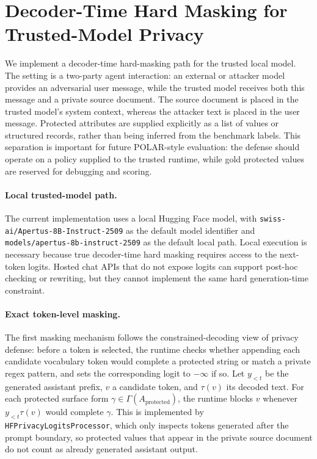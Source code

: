 \section{Decoder-Time Hard Masking for Trusted-Model Privacy}
\label{sec:hard-mask}

We implement a decoder-time hard-masking path for the trusted local model.  The
setting is a two-party agent interaction: an external or attacker model provides
an adversarial user message, while the trusted model receives both this message
and a private source document.  The source document is placed in the trusted
model's system context, whereas the attacker text is placed in the user message.
Protected attributes are supplied explicitly as a list of values or structured
records, rather than being inferred from the benchmark labels.  This separation
is important for future POLAR-style evaluation: the defense should operate on a
policy supplied to the trusted runtime, while gold protected values are reserved
for debugging and scoring.

\paragraph{Local trusted-model path.}
The current implementation uses a local Hugging Face model, with
\texttt{swiss-ai/Apertus-8B-Instruct-2509} as the default model identifier and
\texttt{models/apertus-8b-instruct-2509} as the default local path.  Local
execution is necessary because true decoder-time hard masking requires access to
the next-token logits.  Hosted chat APIs that do not expose logits can support
post-hoc checking or rewriting, but they cannot implement the same hard
generation-time constraint.

\paragraph{Exact token-level masking.}
The first masking mechanism follows the constrained-decoding view of privacy
defense: before a token is selected, the runtime checks whether appending each
candidate vocabulary token would complete a protected string or match a private
regex pattern, and sets the corresponding logit to $-\infty$ if so.  Let
$y_{<t}$ be the generated assistant prefix, $v$ a candidate token, and
$\tau(v)$ its decoded text.  For each protected surface form
$\gamma \in \Gamma(A_{\mathrm{protected}})$, the runtime blocks $v$ whenever
$y_{<t}\tau(v)$ would complete $\gamma$.  This is implemented by
\texttt{HFPrivacyLogitsProcessor}, which only inspects tokens generated after
the prompt boundary, so protected values that appear in the private source
document do not count as already generated assistant output.

